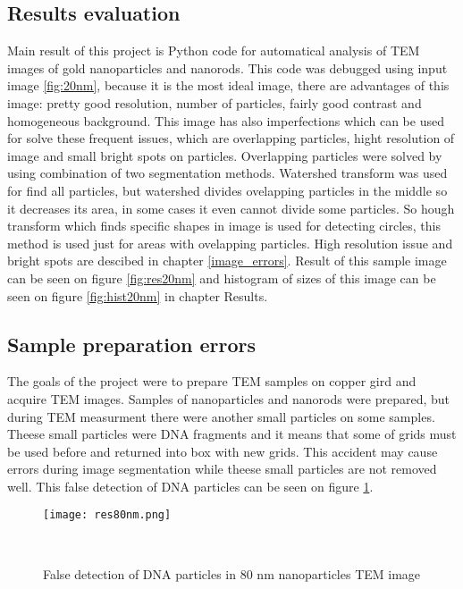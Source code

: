 \pagestyle{plain}

\subsection{Results evaluation}

Main result of this project is Python code for automatical analysis of TEM images of gold nanoparticles and nanorods. This code was debugged using input image \ref{fig:20nm}, because it is the most ideal image, there are advantages of this image: pretty good resolution, number of particles, fairly good contrast and homogeneous background. This image has also imperfections which can be used for solve these frequent issues, which are overlapping particles, hight resolution of image and small bright spots on particles. Overlapping particles were solved by using combination of two segmentation methods. Watershed transform was used for find all particles, but watershed divides ovelapping particles in the middle so it decreases its area, in some cases it even cannot divide some particles. So hough transform which finds specific shapes in image is used for detecting circles, this method is used just for areas with ovelapping particles. High resolution issue and bright spots are descibed in chapter \ref{image_errors}. Result of this sample image can be seen on figure \ref{fig:res20nm} and histogram of sizes of this image can be seen on figure \ref{fig:hist20nm} in chapter Results.

\subsection{Sample preparation errors}\label{measurment_errors}

The goals of the project were to prepare TEM samples on copper gird and acquire TEM images. Samples of nanoparticles and nanorods were prepared, but during TEM measurment there were another small particles on some samples. Theese small particles were DNA fragments and it means that some of grids must be used before and returned into box with new grids. This accident may cause errors during image segmentation while theese small particles are not removed well. This false detection of DNA particles can be seen on figure \ref{fig:res50nm}.

\begin{figure}[h!]
\begin{center}
    \texttt{[image: res80nm.png]}
    \caption{False detection of DNA particles in 80 nm nanoparticles TEM image}~\label{fig:res50nm}
\end{center}
\end{figure}

